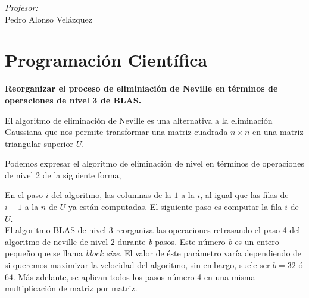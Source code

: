 \documentclass[a4paper,12pt]{article}
\begin{document}
\begin{titlepage}
\begin{center}
\begin{minipage}{0.4\textwidth}
\begin{flushright}
\emph{Profesor:} \\
Pedro Alonso Vel\'azquez\\
\end{flushright}
\end{minipage}

\end{center}


\end{titlepage}

\pagebreak
\tableofcontents
\pagebreak

\section{Programaci\'on Cient\'ifica}


\textbf{Reorganizar el proceso de eliminiaci\'on de Neville en t\'erminos de operaciones de nivel 3 de BLAS.}\\

\smallskip

El algoritmo de eliminaci\'on de Neville es una alternativa a la eliminaci\'on Gaussiana que nos permite transformar una matriz cuadrada $n\times n$  en una matriz triangular superior $U$.

Podemos expresar el algoritmo de eliminación de nivel en t\'erminos de operaciones de nivel 2 de la siguiente forma,\\

\begin{algorithmic}[1]\label{neville2}
		\ENDIF
	\ENDFOR
\end{algorithmic}

\bigskip

En el paso $i$ del algoritmo, las columnas de la $1$ a la $i$, al igual que las filas de $i+1$ a la $n$ de $U$ ya est\'an computadas. El siguiente paso es computar la fila $i$ de $U$. \\

El algoritmo BLAS de nivel 3 reorganiza las operaciones retrasando el paso 4 del algoritmo de neville de nivel 2 durante \textit{b} pasos. Este n\'umero \textit{b} es un entero peque\~no que se llama \textit{block size}. El valor de \'este par\'ametro var\'ia dependiendo de si queremos maximizar la velocidad del algoritmo, sin embargo, suele ser $b=32$ \'o $64$. M\'as adelante, se aplican todos los pasos n\'umero 4 en una misma multiplicaci\'on de matriz por matriz.\\
\end{document}
